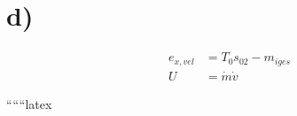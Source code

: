 

\section*{d)}

\begin{align*}
e_{x,vel} &= T_0 s_{02} - m_{iges} \\
U &= \dot{m} \dot{v}
\end{align*}

``````latex